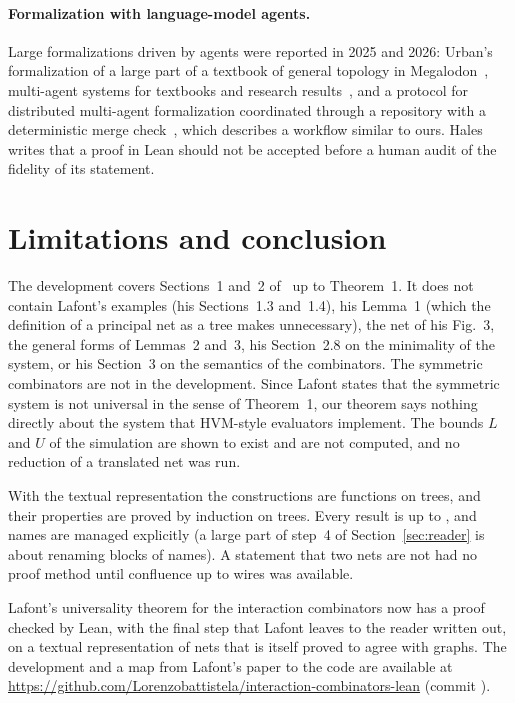 \documentclass[11pt,a4paper]{article}
\newcommand{\Equiv}{\cod{Equiv}}
\begin{document}
\paragraph{Formalization with language-model agents.}
Large formalizations driven by agents were reported in 2025 and 2026: Urban's formalization of
a large part of a textbook of general topology in Megalodon~\cite{urban2026}, multi-agent systems for textbooks and research
results~\cite{rammal2026,leanmarathon2026}, and a protocol for distributed multi-agent
formalization coordinated through a repository with a deterministic merge
check~\cite{choir2026}, which describes a workflow similar to ours. Hales~\cite{hales2026}
writes that a proof in Lean should not be accepted before a human audit of the fidelity of its
statement.

\section{Limitations and conclusion}
\label{sec:limits}

The development covers Sections~1 and~2 of~\cite{lafont1997} up to Theorem~1. It does not
contain Lafont's examples (his Sections~1.3 and~1.4), his Lemma~1 (which the definition of a
principal net as a tree makes unnecessary), the net of his Fig.~3, the general forms of
Lemmas~2 and~3, his Section~2.8 on the minimality of the system, or his Section~3 on the
semantics of the combinators. The
symmetric combinators are not in the development. Since Lafont states that the symmetric system
is not universal in the sense of Theorem~1, our theorem says nothing directly about the system
that HVM-style evaluators implement. The bounds $L$ and $U$ of the simulation are shown to
exist and are not computed, and no reduction of a translated net was run.

With the textual representation the constructions are functions on trees, and their properties
are proved by induction on trees. Every result is up to \Equiv{}, and names are managed
explicitly (a large part of step~4 of Section~\ref{sec:reader} is about renaming blocks of
names). A statement that two nets are not \Equiv{} had no proof method until confluence up to
wires was available.

Lafont's universality theorem for the interaction combinators now has a proof checked by Lean,
with the final step that Lafont leaves to the reader written out, on a textual
representation of nets that is itself proved to agree with graphs. The development and a map
from Lafont's paper to the code are available at
\url{https://github.com/Lorenzobattistela/interaction-combinators-lean} (commit ).



\end{document}
